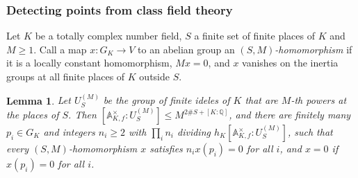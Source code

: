 \documentclass[10pt]{amsart}
\newtheorem{lemma}[theorem]{Lemma}
\theoremstyle{definition}
\theoremstyle{remark}
\newcommand{\Q}{\mathbb Q}
\begin{document}
\subsubsection{Detecting points from class field theory}\label{pod:ss-detect}

Let $K$ be a totally complex number field, $S$ a finite set of finite places of $K$ and $M\ge1$.
Call a map $x\colon G_K\to V$ to an abelian group an \emph{$(S,M)$-homomorphism} if it is a locally
constant homomorphism, $Mx=0$, and $x$ vanishes on the inertia groups at all finite places of $K$
outside $S$.

\begin{lemma}\label{pod:cft}
Let $U_S^{(M)}$ be the group of finite ideles of $K$ that are $M$-th powers at the places of $S$.
Then $[\mathbb A_{K,f}^\times:U_S^{(M)}]\le M^{2\#S+[K:\Q]}$, and there are finitely many $p_i\in
G_K$ and integers $n_i\ge2$ with $\prod_in_i$ dividing $h_K[\mathbb A_{K,f}^\times:U_S^{(M)}]$,
such that every $(S,M)$-homomorphism $x$ satisfies $n_ix(p_i)=0$ for all $i$, and $x=0$ if
$x(p_i)=0$ for all $i$.
\end{lemma}
\end{document}
